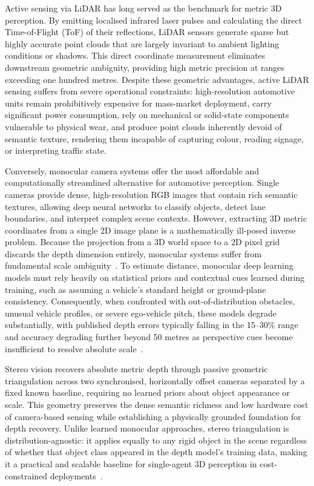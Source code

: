Active sensing via LiDAR has long served as the benchmark for metric 3D
perception. By emitting localised infrared laser pulses and calculating the
direct Time-of-Flight (ToF) of their reflections, LiDAR sensors generate sparse
but highly accurate point clouds that are largely invariant to ambient lighting
conditions or shadows. This direct coordinate measurement eliminates downstream
geometric ambiguity, providing high metric precision at ranges exceeding one
hundred metres. Despite these geometric advantages, active LiDAR sensing suffers
from severe operational constraints: high-resolution automotive units remain
prohibitively expensive for mass-market deployment, carry significant power
consumption, rely on mechanical or solid-state components vulnerable to physical
wear, and produce point clouds inherently devoid of semantic texture, rendering
them incapable of capturing colour, reading signage, or interpreting traffic
state.

Conversely, monocular camera systems offer the most affordable and
computationally streamlined alternative for automotive perception. Single cameras
provide dense, high-resolution RGB images that contain rich semantic textures,
allowing deep neural networks to classify objects, detect lane boundaries, and
interpret complex scene contexts. However, extracting 3D metric coordinates from
a single 2D image plane is a mathematically ill-posed inverse problem. Because
the projection from a 3D world space to a 2D pixel grid discards the depth
dimension entirely, monocular systems suffer from fundamental scale
ambiguity~\cite{huang2025monocular}. To estimate distance, monocular deep
learning models must rely heavily on statistical priors and contextual cues
learned during training, such as assuming a vehicle's standard height or
ground-plane consistency. Consequently, when confronted with out-of-distribution
obstacles, unusual vehicle profiles, or severe ego-vehicle pitch, these models
degrade substantially, with published depth errors typically falling in the
15--30\% range and accuracy degrading further beyond 50 metres as perspective
cues become insufficient to resolve absolute scale~\cite{huang2025}.

Stereo vision recovers absolute metric depth through passive geometric
triangulation across two synchronised, horizontally offset cameras separated by a
fixed known baseline, requiring no learned priors about object appearance or
scale. This geometry preserves the dense semantic richness and low hardware cost
of camera-based sensing while establishing a physically grounded foundation for
depth recovery. Unlike learned monocular approaches, stereo triangulation is
distribution-agnostic: it applies equally to any rigid object in the scene
regardless of whether that object class appeared in the depth model's training
data, making it a practical and scalable baseline for single-agent 3D perception
in cost-constrained deployments~\cite{huang2025}.

